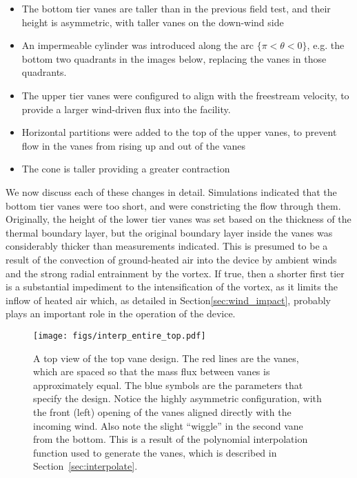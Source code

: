 \begin{itemize}
\item The bottom tier vanes are taller than in the previous field test, 
      and their height is asymmetric, with taller vanes on the down-wind side
\item An impermeable cylinder was introduced along the arc $\{\pi < \theta
      < 0 \}$, e.g. the bottom two quadrants in the images below, replacing the
vanes in those quadrants. 
\item The upper tier vanes were configured to align with the freestream
velocity, to provide a larger wind-driven flux into the facility.
\item Horizontal partitions were added to the top of the upper vanes, to
prevent flow in the vanes from rising up and out of the vanes
\item The cone is taller providing a greater contraction
\end{itemize}

We now discuss each of these changes in detail. Simulations indicated that 
the bottom tier vanes were too short, and were constricting the flow 
through them. Originally, the height of the lower
tier vanes was set based on the thickness of the 
thermal boundary layer, but the original boundary layer inside
the vanes was considerably thicker than measurements indicated. 
This is presumed to be a result of the
convection of ground-heated air into the device by ambient winds and
the strong radial entrainment by the vortex. If true, then a shorter
first tier is a substantial impediment to the intensification of the
vortex, as it limits the inflow of heated air which, as detailed
in Section\ref{sec:wind_impact}, probably plays an important role in 
the operation of the device.


 \begin{figure}[!htb]
  \begin{center}
   \texttt{[image: figs/interp\_entire\_top.pdf]}
   \caption{A top view of the top vane design. The red lines are the
     vanes, which are spaced so that the mass flux between vanes is
     approximately equal. The blue symbols are the parameters that
     specify the design. Notice the highly asymmetric configuration,
     with the front (left) opening of the vanes aligned directly with
     the incoming wind. Also note the slight ``wiggle'' in the second
   vane from the bottom. This is a result of the polynomial
   interpolation function used to generate the vanes, which is described
   in Section~\ref{sec:interpolate}.} 
   \label{fig:top_design}
  \end{center}
 \end{figure}

